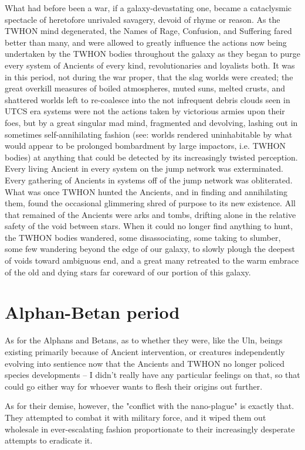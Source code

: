 What had before been a war, if a galaxy-devastating one, became a
cataclysmic spectacle of heretofore unrivaled savagery, devoid of
rhyme or reason. As the TWHON mind degenerated, the Names of Rage,
Confusion, and Suffering fared better than many, and were allowed to
greatly influence the actions now being undertaken by the TWHON bodies
throughout the galaxy as they began to purge every system of Ancients
of every kind, revolutionaries and loyalists both. It was in this
period, not during the war proper, that the slag worlds were created;
the great overkill measures of boiled atmospheres, muted suns, melted
crusts, and shattered worlds left to re-coalesce into the not
infrequent debris clouds seen in UTCS era systems were not the actions
taken by victorious armies upon their foes, but by a great singular
mad mind, fragmented and devolving, lashing out in sometimes
self-annihilating fashion (see: worlds rendered uninhabitable by what
would appear to be prolonged bombardment by large impactors,
i.e. TWHON bodies) at anything that could be detected by its
increasingly twisted perception. Every living Ancient in every system
on the jump network was exterminated. Every gathering of Ancients in
systems off of the jump network was obliterated. What was once TWHON
hunted the Ancients, and in finding and annihilating them, found the
occasional glimmering shred of purpose to its new existence. All that
remained of the Ancients were arks and tombs, drifting alone in the
relative safety of the void between stars. When it could no longer
find anything to hunt, the TWHON bodies wandered, some disassociating,
some taking to slumber, some few wandering beyond the edge of our
galaxy, to slowly plough the deepest of voids toward ambiguous end,
and a great many retreated to the warm embrace of the old and dying
stars far coreward of our portion of this galaxy.

\section{Alphan-Betan period}
As for the Alphans and Betans, as to whether they were, like the Uln,
beings existing primarily because of Ancient intervention, or
creatures independently evolving into sentience now that the Ancients
and TWHON no longer policed species developments -- I didn't really
have any particular feelings on that, so that could go either way for
whoever wants to flesh their origins out further.

As for their demise, however, the "conflict with the nano-plague" is
exactly that. They attempted to combat it with military force, and it
wiped them out wholesale in ever-escalating fashion proportionate to
their increasingly desperate attempts to eradicate it.

